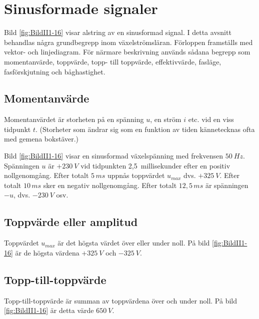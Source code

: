 \section{Sinusformade signaler}


Bild \ref{fig:BildII1-16} visar alstring av en sinusformad signal.
I detta avsnitt behandlas några grundbegrepp inom växelströmsläran.
Förloppen framställs med vektor- och linjediagram.
För närmare beskrivning används sådana begrepp som momentanvärde,
toppvärde, topp- till toppvärde, effektivvärde, fasläge, fasförskjutning och
båghastighet.

\subsection{Momentanvärde}

Momentanvärdet är storheten på en spänning \(u\), en ström \(i\) etc. vid en
viss tidpunkt \(t\).
(Storheter som ändrar sig som en funktion av tiden kännetecknas ofta med gemena
bokstäver.)

Bild \ref{fig:BildII1-16} visar en sinusformad växelspänning med frekvensen
\(50\ Hz\).
Spänningen \(u\) är \(+230\ V\) vid tidpunkten 2,5~millisekunder efter en
positiv nollgenomgång.
Efter totalt \(5\, ms\) uppnås toppvärdet \(u_{max}\) dvs. \(+325\ V\).
Efter totalt \(10\, ms\) sker en negativ nollgenomgång.
Efter totalt \(12,5\, ms\) är spänningen \(-u\), dvs. \(-230\ V\) osv.

\subsection{Toppvärde eller amplitud}

Toppvärdet \(u_{max}\) är det högsta värdet över eller under noll.
På bild \ref{fig:BildII1-16} är de högsta värdena \(+325\ V\) och \(-325\ V\).

\subsection{Topp-till-toppvärde}

Topp-till-toppvärde är summan av toppvärdena över och under noll.
På bild \ref{fig:BildII1-16} är detta värde \(650\ V\).

